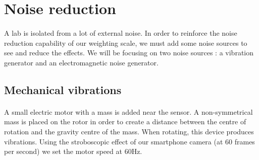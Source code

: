 \documentclass{article}[12pt]
\begin{document}
\section{Noise reduction}
\paragraph{}
A lab is isolated from a lot of external noise. In order to reinforce the noise reduction capability of our weighting scale, we must add some noise sources to see and reduce the effects. We will be focusing on two noise sources : a vibration generator and an electromagnetic noise generator.
\subsection{Mechanical vibrations}
\paragraph{}
A small electric motor with a mass is added near the sensor. A non-symmetrical mass is placed on the rotor in order to create a distance between the centre of rotation and the gravity centre of the mass. When rotating, this device produces vibrations. Using the stroboscopic effect of our smartphone camera (at 60 frames per second) we set the motor speed at 60Hz.
\end{document}
